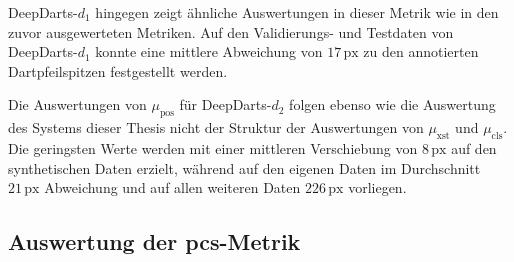 DeepDarts-$d_1$ hingegen zeigt ähnliche Auswertungen in dieser Metrik wie in den zuvor ausgewerteten Metriken. Auf den Validierungs- und Testdaten von DeepDarts-$d_1$ konnte eine mittlere Abweichung von $17\,\text{px}$ zu den annotierten Dartpfeilspitzen festgestellt werden.

Die Auswertungen von $\mu_\text{pos}$ für DeepDarts-$d_2$ folgen ebenso wie die Auswertung des Systems dieser Thesis nicht der Struktur der Auswertungen von $\mu_\text{xst}$ und $\mu_\text{cls}$. Die geringsten Werte werden mit einer mittleren Verschiebung von $8\,\text{px}$ auf den synthetischen Daten erzielt, während auf den eigenen Daten im Durchschnitt $21\,\text{px}$ Abweichung und auf allen weiteren Daten $226\,\text{px}$ vorliegen.


\subsection{Auswertung der \acs{pcs}-Metrik}
\label{sec:auswertung_pcs}

\NNPCS

